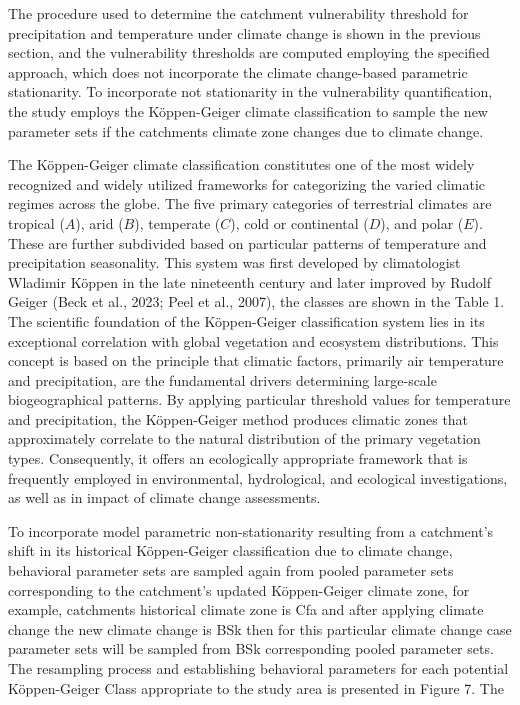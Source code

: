 \documentclass[
]{article}
\begin{document}
The procedure used to determine the catchment vulnerability threshold
for precipitation and temperature under climate change is shown in the
previous section, and the vulnerability thresholds are computed
employing the specified approach, which does not incorporate the climate
change-based parametric stationarity. To incorporate not stationarity in
the vulnerability quantification, the study employs the Köppen-Geiger
climate classification to sample the new parameter sets if the
catchment\textquotesingle s climate zone changes due to climate change.

The Köppen-Geiger climate classification constitutes one of the most
widely recognized and widely utilized frameworks for categorizing the
varied climatic regimes across the globe. The five primary categories of
terrestrial climates are tropical (\(A\)), arid (\(B\)), temperate
(\(C\)), cold or continental (\(D\)), and polar (\(E\)). These are
further subdivided based on particular patterns of temperature and
precipitation seasonality. This system was first developed by
climatologist Wladimir Köppen in the late nineteenth century and later
improved by Rudolf Geiger (Beck et al., 2023; Peel et al., 2007), the
classes are shown in the Table 1. The scientific foundation of the
Köppen-Geiger classification system lies in its exceptional correlation
with global vegetation and ecosystem distributions. This concept is
based on the principle that climatic factors, primarily air temperature
and precipitation, are the fundamental drivers determining large-scale
biogeographical patterns. By applying particular threshold values for
temperature and precipitation, the Köppen-Geiger method produces
climatic zones that approximately correlate to the natural distribution
of the primary vegetation types. Consequently, it offers an ecologically
appropriate framework that is frequently employed in environmental,
hydrological, and ecological investigations, as well as in impact of
climate change assessments.

To incorporate model parametric non-stationarity resulting from a
catchment's shift in its historical Köppen-Geiger classification due to
climate change, behavioral parameter sets are sampled again from pooled
parameter sets corresponding to the catchment's updated Köppen-Geiger
climate zone, for example, catchments historical climate zone is Cfa and
after applying climate change the new climate change is BSk then for
this particular climate change case parameter sets will be sampled from
BSk corresponding pooled parameter sets. The resampling process and
establishing behavioral parameters for each potential Köppen-Geiger
Class appropriate to the study area is presented in Figure 7. The
\end{document}
